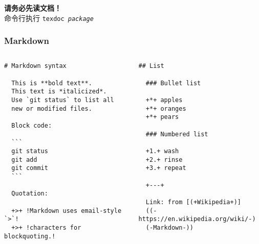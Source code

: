 \begin{frame}[standout]
  \huge \textbf{请务必先读文档！} \\[1ex] \pause
  \footnotesize 命令行执行 \texttt{texdoc \textit{package}}
\end{frame}

\begin{frame}[fragile]
\frametitle[Markdown]{%
  Markdown }
\begin{columns}
\begin{column}{0.48\textwidth}
  \begin{lstlisting}[gobble=2]
  # Markdown syntax

  This is **bold text**.
  This text is *italicized*.
  Use `git status` to list all
  new or modified files.

  Block code:

  ```
  git status
  git add
  git commit
  ```

  Quotation:

  +>+ !Markdown uses email-style `>`!
  +>+ !characters for blockquoting.!
  \end{lstlisting}
\end{column}
\begin{column}{0.48\textwidth}
  \begin{lstlisting}[gobble=2]
  ## List

  ### Bullet list

  +*+ apples
  +*+ oranges
  +*+ pears

  ### Numbered list

  +1.+ wash
  +2.+ rinse
  +3.+ repeat

  +---+

  Link: from [(+Wikipedia+)]
  ((-https://en.wikipedia.org/wiki/-)
  (-Markdown-))

  \end{lstlisting}
\end{column}
\end{columns}
\vspace{-0.6cm}
\end{frame}

